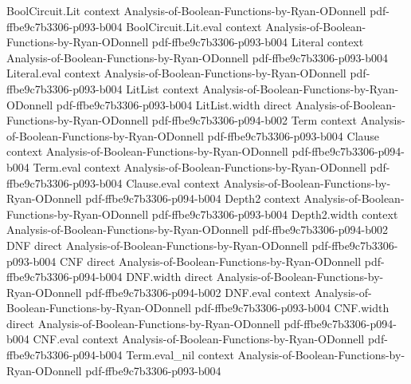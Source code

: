\begin{lemma}
\label{DecisionTree.size_le_two_pow_depth}
\leanok
{}
\proofstep
  {BoolCircuit.Lit}
  {context}
  {Analysis-of-Boolean-Functions-by-Ryan-ODonnell}
  {pdf-ffbe9c7b3306-p093-b004}
\proofstep
  {BoolCircuit.Lit.eval}
  {context}
  {Analysis-of-Boolean-Functions-by-Ryan-ODonnell}
  {pdf-ffbe9c7b3306-p093-b004}
\proofstep
  {Literal}
  {context}
  {Analysis-of-Boolean-Functions-by-Ryan-ODonnell}
  {pdf-ffbe9c7b3306-p093-b004}
\proofstep
  {Literal.eval}
  {context}
  {Analysis-of-Boolean-Functions-by-Ryan-ODonnell}
  {pdf-ffbe9c7b3306-p093-b004}
\proofstep
  {LitList}
  {context}
  {Analysis-of-Boolean-Functions-by-Ryan-ODonnell}
  {pdf-ffbe9c7b3306-p093-b004}
\proofstep
  {LitList.width}
  {direct}
  {Analysis-of-Boolean-Functions-by-Ryan-ODonnell}
  {pdf-ffbe9c7b3306-p094-b002}
\proofstep
  {Term}
  {context}
  {Analysis-of-Boolean-Functions-by-Ryan-ODonnell}
  {pdf-ffbe9c7b3306-p093-b004}
\proofstep
  {Clause}
  {context}
  {Analysis-of-Boolean-Functions-by-Ryan-ODonnell}
  {pdf-ffbe9c7b3306-p094-b004}
\proofstep
  {Term.eval}
  {context}
  {Analysis-of-Boolean-Functions-by-Ryan-ODonnell}
  {pdf-ffbe9c7b3306-p093-b004}
\proofstep
  {Clause.eval}
  {context}
  {Analysis-of-Boolean-Functions-by-Ryan-ODonnell}
  {pdf-ffbe9c7b3306-p094-b004}
\proofstep
  {Depth2}
  {context}
  {Analysis-of-Boolean-Functions-by-Ryan-ODonnell}
  {pdf-ffbe9c7b3306-p093-b004}
\proofstep
  {Depth2.width}
  {context}
  {Analysis-of-Boolean-Functions-by-Ryan-ODonnell}
  {pdf-ffbe9c7b3306-p094-b002}
\proofstep
  {DNF}
  {direct}
  {Analysis-of-Boolean-Functions-by-Ryan-ODonnell}
  {pdf-ffbe9c7b3306-p093-b004}
\proofstep
  {CNF}
  {direct}
  {Analysis-of-Boolean-Functions-by-Ryan-ODonnell}
  {pdf-ffbe9c7b3306-p094-b004}
\proofstep
  {DNF.width}
  {direct}
  {Analysis-of-Boolean-Functions-by-Ryan-ODonnell}
  {pdf-ffbe9c7b3306-p094-b002}
\proofstep
  {DNF.eval}
  {context}
  {Analysis-of-Boolean-Functions-by-Ryan-ODonnell}
  {pdf-ffbe9c7b3306-p093-b004}
\proofstep
  {CNF.width}
  {direct}
  {Analysis-of-Boolean-Functions-by-Ryan-ODonnell}
  {pdf-ffbe9c7b3306-p094-b004}
\proofstep
  {CNF.eval}
  {context}
  {Analysis-of-Boolean-Functions-by-Ryan-ODonnell}
  {pdf-ffbe9c7b3306-p094-b004}
\proofstep
  {Term.eval_nil}
  {context}
  {Analysis-of-Boolean-Functions-by-Ryan-ODonnell}
  {pdf-ffbe9c7b3306-p093-b004}
\proofstep

\end{lemma}
